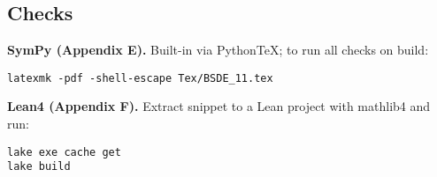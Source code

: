 ﻿\documentclass[11pt,letterpaper,oneside]{article}
\numberwithin{equation}{section}
\newcommand{\1}{\mathbf{1}}
\begin{document}
\subsection*{Checks}
\textbf{SymPy (Appendix E).} Built-in via PythonTeX; to run all checks on build:
\begin{tcolorbox}[sympycheckstyle]
\begin{Verbatim}[fontsize=\small]
latexmk -pdf -shell-escape Tex/BSDE_11.tex
\end{Verbatim}
\end{tcolorbox}

\textbf{Lean4 (Appendix F).} Extract snippet to a Lean project with mathlib4 and run:
\begin{tcolorbox}[leanproofstyle]
\begin{Verbatim}[fontsize=\small]
lake exe cache get
lake build
\end{Verbatim}
\end{tcolorbox}

\end{document}
